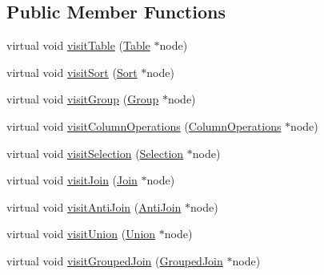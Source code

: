 \subsection*{Public Member Functions}
\begin{DoxyCompactItemize}
\item 
virtual void \hyperlink{class_algebra_visitor_ac14f3c3c195373e3bae5d01d04f1ea09}{visit\+Table} (\hyperlink{class_table}{Table} $\ast$node)
\item 
virtual void \hyperlink{class_algebra_visitor_ac350bf44664ce021c0cfec18258a14e8}{visit\+Sort} (\hyperlink{class_sort}{Sort} $\ast$node)
\item 
virtual void \hyperlink{class_algebra_visitor_af77bf2aaa949ea27cf992053c43a391b}{visit\+Group} (\hyperlink{class_group}{Group} $\ast$node)
\item 
virtual void \hyperlink{class_algebra_visitor_a1109510d982a8e5b90fc56d443109ef9}{visit\+Column\+Operations} (\hyperlink{class_column_operations}{Column\+Operations} $\ast$node)
\item 
virtual void \hyperlink{class_algebra_visitor_a7d9b0618ac2fdd036abdab27cbb83d40}{visit\+Selection} (\hyperlink{class_selection}{Selection} $\ast$node)
\item 
virtual void \hyperlink{class_algebra_visitor_a841875539a07c979b912ef44455b873c}{visit\+Join} (\hyperlink{class_join}{Join} $\ast$node)
\item 
virtual void \hyperlink{class_algebra_visitor_add62415db5f188e572cef1c36faa842e}{visit\+Anti\+Join} (\hyperlink{class_anti_join}{Anti\+Join} $\ast$node)
\item 
virtual void \hyperlink{class_algebra_visitor_a681732083691701f0e9c10980392dd3c}{visit\+Union} (\hyperlink{class_union}{Union} $\ast$node)
\item 
virtual void \hyperlink{class_algebra_visitor_ae92c2f0a465dacc4f42a71e879346c94}{visit\+Grouped\+Join} (\hyperlink{class_grouped_join}{Grouped\+Join} $\ast$node)
\end{DoxyCompactItemize}
